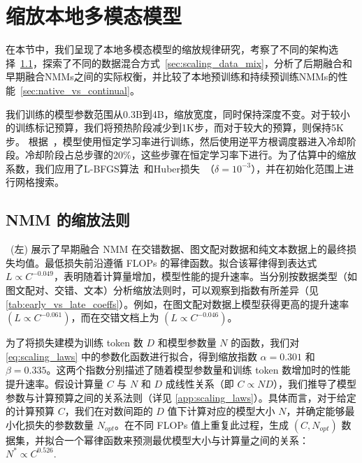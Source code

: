 \section{缩放本地多模态模型}

在本节中，我们呈现了本地多模态模型的缩放规律研究，考察了不同的架构选择~\cref{sec:scaling_laws_early}，探索了不同的数据混合方式~\cref{sec:scaling_data_mix}，分析了后期融合和早期融合NMMs之间的实际权衡，并比较了本地预训练和持续预训练NMMs的性能~\cref{sec:native_vs_continual}。

 我们训练的模型参数范围从0.3B到4B，缩放宽度，同时保持深度不变。对于较小的训练标记预算，我们将预热阶段减少到1K步，而对于较大的预算，则保持5K步。
根据~\citet{hagele2024scaling}，模型使用恒定学习率进行训练，然后使用逆平方根调度器进入冷却阶段。冷却阶段占总步骤的20\%，这些步骤在恒定学习率下进行。为了估算中的缩放系数，我们应用了L-BFGS算法~\citep{lbfgs}和Huber损失~\citep{Huber1992}（$\delta = 10^{-3}$），并在初始化范围上进行网格搜索。





\vspace{-0.5cm}
\subsection{NMM 的缩放法则}
\label{sec:scaling_laws_early}

~(左) 展示了早期融合 NMM 在交错数据、图文配对数据和纯文本数据上的最终损失均值。最低损失前沿遵循 FLOPs 的幂律函数。拟合该幂律得到表达式 $L \propto C^{-0.049}$，表明随着计算量增加，模型性能的提升速率。当分别按数据类型（如图文配对、交错、文本）分析缩放法则时，可以观察到指数有所差异（见 \cref{tab:early_vs_late_coeffs}）。例如，在图文配对数据上模型获得更高的提升速率 $(L \propto C^{-0.061})$，而在交错文档上为 $(L \propto C^{-0.046})$。

为了将损失建模为训练 token 数 $D$ 和模型参数量 $N$ 的函数，我们对 \cref{eq:scaling_laws} 中的参数化函数进行拟合，得到缩放指数 $\alpha = 0.301$ 和 $\beta = 0.335$。这两个指数分别描述了随着模型参数量和训练 token 数增加时的性能提升速率。假设计算量 $C$ 与 $N$ 和 $D$ 成线性关系（即 $C \propto ND$），我们推导了模型参数与计算预算之间的关系法则（详见 \cref{app:scaling_laws}）。具体而言，对于给定的计算预算 $C$，我们在对数间距的 $D$ 值下计算对应的模型大小 $N$，并确定能够最小化损失的参数数量 $N_{opt}$。在不同 FLOPs 值上重复此过程，生成 $(C, N_{opt})$ 数据集，并拟合一个幂律函数来预测最优模型大小与计算量之间的关系：$N^* \propto C^{0.526}.$

